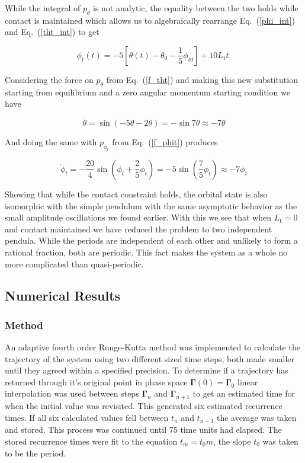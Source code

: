 \documentclass[prbg,preprint]{revtex4-1}
\begin{document}
While the integral of $p_\theta$ is not analytic, the equality between the two holds while contact is maintained which allows us to algebraically rearrange Eq.~(\ref{phi_int}) and Eq.~(\ref{tht_int}) to get

\begin{equation}
	\phi_t(t)=  -5
	\left[
	\theta(t)-\theta_{0}-\frac{1}{5}\phi_{t0}
	\right] 
	+ 10L_\textrm{t} t .
\end{equation}

Considering the force on $p_\theta$ from Eq.~(\ref{f_tht}) and making this new substitution starting from equilibrium and a zero angular momentum starting condition we have

\begin{equation}
	\ddot \theta = \sin(-5\theta -2\theta) = -\sin 7\theta \approx -7\theta
\end{equation}

And doing the same with $p_{\phi_t}$ from Eq.~(\ref{f_phit}) produces

\begin{equation}
	\ddot \phi_t = -\frac{20}{4}\sin(\phi_t +\frac{2}{5}\phi_t) =  -5\sin\left ( \frac{7}{5}\phi_t \right )\approx -7\phi_t
\end{equation}

Showing that while the contact constraint holds, the orbital state is also isomorphic with the simple pendulum with the same asymptotic behavior as the small amplitude oscillations we found earlier. With this we see that when $L_\textrm{t}=0$ and contact maintained we have reduced the problem to two independent pendula. While the periods are independent of each other and unlikely to form a rational fraction, both are periodic. This fact makes the system as a whole no more complicated than quasi-periodic.

\subsection{Numerical Results}
\subsubsection{Method}
An adaptive fourth order Runge-Kutta method was implemented to calculate the trajectory of the system using two different sized time steps, both made smaller until they agreed within a specified precision. To determine if a trajectory has returned through it's original point in phase space $\boldsymbol{\Gamma}(0)=\boldsymbol{\Gamma}_0$ linear interpolation was used between steps $\boldsymbol{\Gamma}_n$ and $\boldsymbol{\Gamma}_{n+1}$ to get an estimated time for when the initial value was revisited. This generated six estimated recurrence times. If all six calculated values fell between $t_n$ and $t_{n+1}$ the average was taken and stored. This process was continued until 75 time units had elapsed. The stored recurrence times were fit to the equation $t_m = t_0m$, the slope $t_0$ was taken to be the period.
\end{document}
